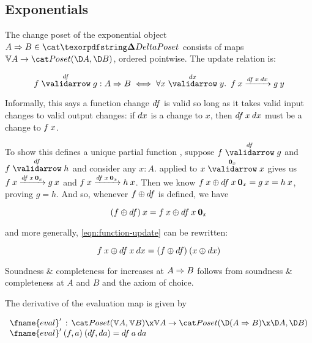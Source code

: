 \documentclass[nomarginums]{rntz}\usepackage[tablet]{fantasy}%
\begin{document}

\subsection{Exponentials}
\label{sec:CP-exponentials}

The change poset of the exponential object $\expO A B \in \CP$ consists of maps
$\vals A \to \Poset(\chgs A, \chgs B)$, ordered pointwise. The update relation
is:

\begin{equation}\label{eqn:function-update}
  f \valid\df g : \expO A B
  \iff \fa{x \valid\dx y} f\<x \longvalid{\df\<x\<\dx} g\<y
\end{equation}

\noindent Informally, this says a function change $df$ is valid so long as it
takes valid input changes to valid output changes: if $dx$ is a change to $x$,
then $\df\<x\<\dx$ must be a change to $f\<x$.

To show this defines a unique partial function \updfn, suppose $\vld\df f g$ and
$\vld\df f h$ and consider any $x : A$.  applied to
$\vld{\zero_x} x x$ gives us $\longvld{\df\<x\<\zero_x}{f\<x}{g\<x}$ and
$\longvld{\df\<x\<\zero_x}{f\<x}{h\<x}$. Then we know \(f\<x \upd
\df\<x\<\zero_x = g\<x = h\<x \), proving $g = h$. And so, whenever $f \mathbin{\oplus} df$
is defined, we have

\begin{equation*} (f \upd \df)\<x = f\<x \upd \df\<x\<\zero_x \end{equation*}

\noindent
and more generally, \cref{eqn:function-update} can be rewritten:

\begin{equation*} f\<x \upd \df\<x\<\dx = (f \upd \df)\<(x \upd \dx) \end{equation*}

\noindent
Soundness \& completeness for increases at $A \Rightarrow B$ follows from soundness \&
completeness at $A$ and $B$ and the axiom of choice. %

The derivative of the evaluation map is given by

\[\begin{array}{l}
  \deriv{\fname{eval}} \,:\,
  \Poset(\vals A, \vals B)
  \x \vals A \to
  \Poset({\chgs{(\expO A B)} \x \chgs A},{\chgs B})
  \\
  \deriv{\fname{eval}} \<(f,a) \<(\df,\da) = \df\<a\<\da
\end{array}\]
\end{document}
